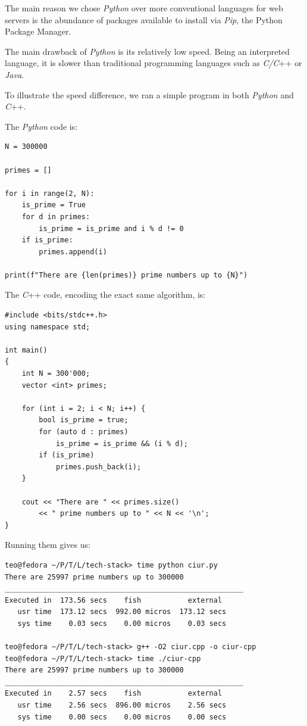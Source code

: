 \documentclass[12pt, a4paper]{report}
\begin{document}
The main reason we chose \textit{Python} over more conventional languages for web servers is the abundance of packages available to install via \textit{Pip}, the Python Package Manager.

The main drawback of \textit{Python} is its relatively low speed. Being an interpreted language, it is slower than traditional programming languages such as \textit{C/C}++ or \textit{Java}.

To illustrate the speed difference, we ran a simple program in both \textit{Python} and \textit{C}++.

The \textit{Python} code is:

\begin{verbatim}
N = 300000

primes = []

for i in range(2, N):
    is_prime = True
    for d in primes:
        is_prime = is_prime and i % d != 0
    if is_prime:
        primes.append(i)

print(f"There are {len(primes)} prime numbers up to {N}")
\end{verbatim}

The \textit{C}++ code, encoding the exact same algorithm, is:
\begin{verbatim}
#include <bits/stdc++.h>
using namespace std;

int main()
{
    int N = 300'000;
    vector <int> primes;

    for (int i = 2; i < N; i++) {
        bool is_prime = true;
        for (auto d : primes)
            is_prime = is_prime && (i % d);
        if (is_prime)
            primes.push_back(i);
    }

    cout << "There are " << primes.size()
        << " prime numbers up to " << N << '\n';
}
\end{verbatim}

Running them gives us:
\begin{verbatim}
teo@fedora ~/P/T/L/tech-stack> time python ciur.py
There are 25997 prime numbers up to 300000
________________________________________________________
Executed in  173.56 secs    fish           external
   usr time  173.12 secs  992.00 micros  173.12 secs
   sys time    0.03 secs    0.00 micros    0.03 secs

teo@fedora ~/P/T/L/tech-stack> g++ -O2 ciur.cpp -o ciur-cpp
teo@fedora ~/P/T/L/tech-stack> time ./ciur-cpp
There are 25997 prime numbers up to 300000
________________________________________________________
Executed in    2.57 secs    fish           external
   usr time    2.56 secs  896.00 micros    2.56 secs
   sys time    0.00 secs    0.00 micros    0.00 secs
\end{verbatim}
\end{document}
